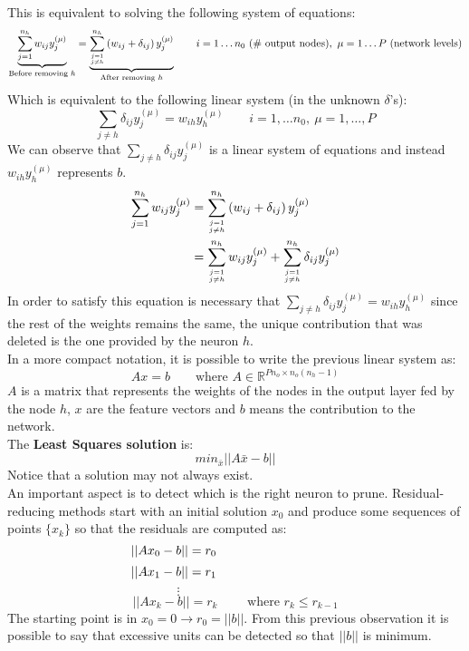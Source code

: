 This is equivalent to solving the following system of equations:
$$\underbrace{\sum_{j=1}^{n_{h}} w_{ij} y_{j}^{(\mu)}}_{\text{Before removing }h} = \underbrace{\sum_{j=1 \atop j\neq h}^{n_{h}} \left( w_{ij} + \delta_{ij} \right) y_{j}^{ (\mu)}}_{\text{After removing }h} \qquad i=1 \dots n_0 \text{ (\# output nodes)},~\mu=1 \dots P \text{ (network levels)}$$
Which is equivalent to the following linear system (in the unknown $\delta$'s):
$$\sum_{j \neq h} \delta_{ij} y_{j}^{(\mu)} = w_{ih} y_{h}^{(\mu)} \qquad i=1, \dots n_0, ~ \mu=1,\dots, P$$
We can observe that $\sum_{j \neq h} \delta_{ij} y_{j}^{(\mu)}$ is a linear system of equations and instead $w_{ih} y_{h}^{(\mu)}$ represents $b$.
\begin{equation*}
\begin{split}
\sum_{j=1}^{n_{h}} w_{ij} y_{j}^{(\mu)} &= \sum_{j=1 \atop j\neq h}^{n_{h}} \left( w_{ij} + \delta_{ij} \right) y_{j}^{ (\mu)} \\
& = \sum_{j=1 \atop j\neq h}^{n_{h}} w_{ij}y_{j}^{ (\mu)} + \sum_{j=1 \atop j\neq h}^{n_{h}}\delta_{ij}  y_{j}^{ (\mu)}
\end{split}
\end{equation*}
In order to satisfy this equation is necessary that $\sum_{j \neq h} \delta_{ij} y_{j}^{(\mu)} = w_{ih} y_{h}^{(\mu)}$ since the rest of the weights remains the same, the unique contribution that was deleted is the one provided by the neuron $h$.\\

In a more compact notation, it is possible to write the previous linear system as:
$$Ax = b \qquad \text{where } A \in \mathbb { R } ^ { P n _ { o } \times n _ { o } \left( n _ { h } - 1 \right) }$$
$A$ is a matrix that represents the weights of the nodes in the output layer fed by the node $h$, $x$ are the feature vectors and $b$ means the contribution to the network.\\
The \textbf{Least Squares solution} is:
$$min_{\bar{x}} \vert \vert A \bar{x} - b \vert \vert$$
Notice that a solution may not always exist.\\
An important aspect is to detect which is the right neuron to prune. Residual-reducing methods start with an initial solution $x_0$ and produce some sequences of points $\{x_k\}$ so that the residuals are computed as:
$$\vert \vert Ax_0 - b \vert \vert  = r_0 \hspace{9.7em} $$
$$\vert \vert Ax_1 - b \vert \vert  = r_1 \hspace{9.7em}$$
$$\vdots \hspace{9em}$$
$$\vert\vert Ax_k - b \vert \vert = r_k \qquad \text{ where } r_k \leq r_{k-1}$$
The starting point is in $x_0 = 0 \rightarrow r_0=||b||$.
From this previous observation it is possible to say that excessive units can be detected so that $|| b ||$ is minimum.\\

